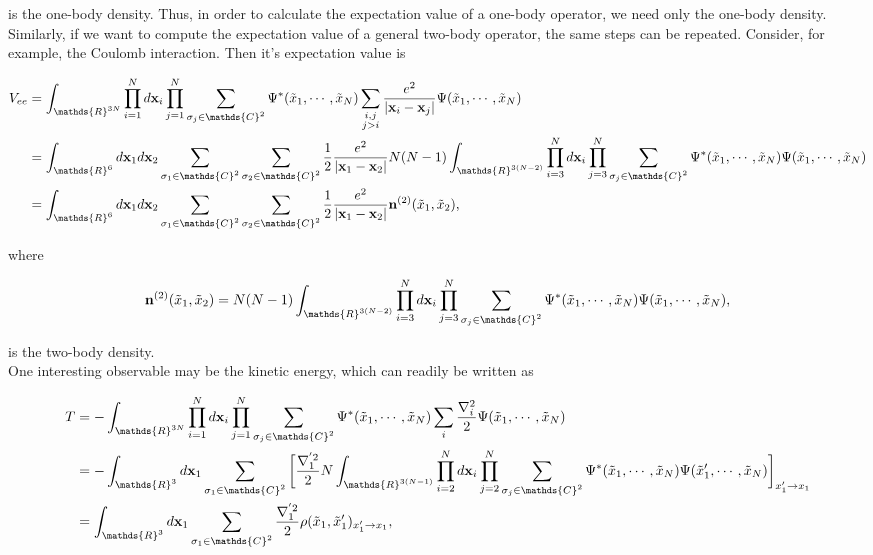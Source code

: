 \documentclass{homework}
\begin{document}
is the one-body density. Thus, in order to calculate the expectation value of a one-body operator, we need only the one-body density. Similarly, if we want to compute the expectation value of a general two-body operator, the same steps can be repeated. Consider, for example, the Coulomb interaction. Then it's expectation value is 

\begin{align}
     V_{ee} &= \int_{\mathds{R}^{3N}} \prod_{i=1}^N d{\bf x}_i \prod_{j=1}^{N} \sum_{\sigma_j \in \mathds{C}^2} \Psi^{*}(\tilde{x}_1, \cdots, \tilde{x}_N)
     \sum_{\substack{i,j\\
          j > i}} 
     \frac{e^2}{|{\bf x}_i-{\bf x}_j|}
     \Psi(\tilde{x}_1, \cdots, \tilde{x}_N) \\
     &= \int_{\mathds{R}^{6}} d{\bf x}_1 d{\bf x}_2 \sum_{\sigma_1 \in \mathds{C}^2} \sum_{\sigma_2 \in \mathds{C}^2} \frac{1}{2} \frac{e^2}{|{\bf x}_1-{\bf x}_2|} N(N-1) \int_{\mathds{R}^{3(N-2)}} \prod_{i=3}^N d{\bf x}_i \prod_{j=3}^{N} \sum_{\sigma_j \in \mathds{C}^2} \Psi^{*}(\tilde{x}_1, \cdots, \tilde{x}_N)
     \Psi(\tilde{x}_1, \cdots, \tilde{x}_N) \\
     &=\int_{\mathds{R}^{6}} d{\bf x}_1 d{\bf x}_2 \sum_{\sigma_1 \in \mathds{C}^2} \sum_{\sigma_2 \in \mathds{C}^2} \frac{1}{2} \frac{e^2}{|{\bf x}_1-{\bf x}_2|} {\bf n}^{(2)}(\tilde{x}_1, \tilde{x}_2),
\label{two-body ensemble avg}
\end{align}

where

$$
{\bf n}^{(2)}(\tilde{x}_1, \tilde{x}_2) = N(N-1) \int_{\mathds{R}^{3(N-2)}} \prod_{i=3}^N d{\bf x}_i \prod_{j=3}^{N} \sum_{\sigma_j \in \mathds{C}^2} \Psi^{*}(\tilde{x}_1, \cdots, \tilde{x}_N)
     \Psi(\tilde{x}_1, \cdots, \tilde{x}_N),
$$

is the two-body density.  \\

One interesting observable may be the kinetic  energy, which can readily be written as 

\begin{align}
     T &= -\int_{\mathds{R}^{3N}} \prod_{i=1}^N d{\bf x}_i \prod_{j=1}^{N} \sum_{\sigma_j \in \mathds{C}^2} \Psi^{*}(\tilde{x}_1, \cdots, \tilde{x}_N)
     \sum_{i}\frac{\nabla^{2}_{i}}{2}
     \Psi(\tilde{x}_1, \cdots, \tilde{x}_N) \\
     &= - \int_{\mathds{R}^{3}} d{\bf x}_1 \sum_{\sigma_1 \in \mathds{C}^2} \bigg[\frac{\nabla^{'2}_1}{2} N \int_{\mathds{R}^{3(N-1)}} \prod_{i=2}^N d{\bf x}_i \prod_{j=2}^{N} \sum_{\sigma_j \in \mathds{C}^2} \Psi^{*}(\tilde{x}_1, \cdots, \tilde{x}_N) \Psi(\tilde{x}'_1, \cdots, \tilde{x}_N)\bigg]_{{x'_1 \rightarrow x_1}} \\
     &= \int_{\mathds{R}^{3}} d{\bf x}_1 \sum_{\sigma_1 \in \mathds{C}^2} \frac{\nabla^{'2}_1}{2} {\rho}(\tilde{x}_1, \tilde{x}'_1)_{{x'_1 \rightarrow x_1}},
\end{align}
\end{document}

